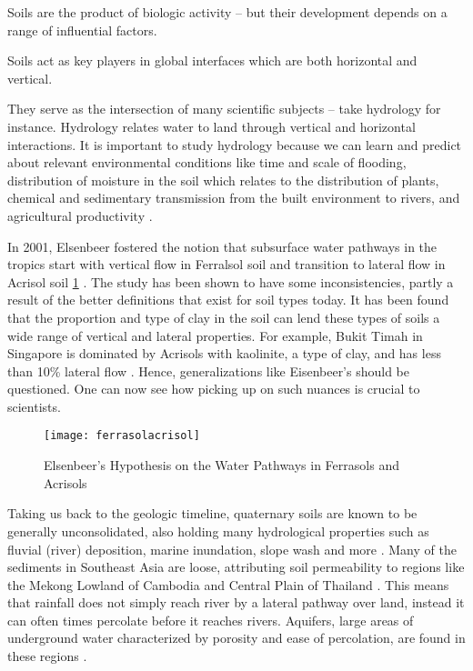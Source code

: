Soils are the product of biologic activity -- but their development depends on a range of influential factors. 


Soils act as key players in global interfaces which are both horizontal and vertical. 

They serve as the intersection of many scientific subjects -- take hydrology for instance. Hydrology relates water to land through vertical and horizontal interactions. It is important to study hydrology because we can learn and predict about relevant environmental conditions like time and scale of flooding, distribution of moisture in the soil which relates to the distribution of plants, chemical and sedimentary transmission from the built environment to rivers, and agricultural productivity \citep{chappell2010soil}. 

In 2001, Elsenbeer fostered the notion that subsurface water pathways in the tropics start with vertical flow in Ferralsol soil and transition to lateral flow in Acrisol soil \ref{fig:ferrasol_acrisol} \citep{elsenbeer2001hydrologic}. The study has been shown to have some inconsistencies, partly a result of the better definitions that exist for soil types today. It has been found that the proportion and type of clay in the soil can lend these types of soils a wide range of vertical and lateral properties. For example, Bukit Timah in Singapore is dominated by Acrisols with kaolinite, a type of clay, and has less than 10\% lateral flow \citep{chappell2005contrasting}. Hence, generalizations like Eisenbeer's should be questioned. One can now see how picking up on such nuances is crucial to scientists.


\begin{figure}
\texttt{[image: ferrasolacrisol]}
\caption{Elsenbeer's Hypothesis on the Water Pathways in Ferrasols and Acrisols}
\label{fig:ferrasol_acrisol}
\end{figure}

Taking us back to the geologic timeline, quaternary soils are known to be generally unconsolidated, also holding many hydrological properties such as fluvial (river) deposition, marine inundation, slope wash and more \citep{chappell2007runoff}. Many of the sediments in Southeast Asia are loose, attributing soil permeability to regions like the Mekong Lowland of Cambodia and Central Plain of Thailand \citep{chiem1993geo}. This means that rainfall does not simply reach river by a lateral pathway over land, instead it can often times percolate before it reaches rivers. Aquifers, large areas of underground water characterized by porosity and ease of percolation, are found in these regions \citep{struckmeier2004groundwater}. \newline

